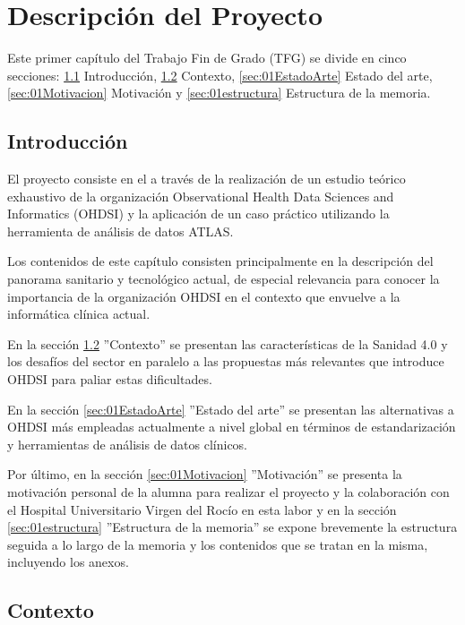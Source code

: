 \chapter{Descripción del Proyecto}\label{cap:01introduccion}

Este primer capítulo del Trabajo Fin de Grado (TFG) se divide en cinco secciones: \ref{sec:01intro} Introducción, \ref{sec:01Contexto} Contexto, \ref{sec:01EstadoArte} Estado del arte, \ref{sec:01Motivacion} Motivación y \ref{sec:01estructura} Estructura de la memoria.

\section{Introducción} \label{sec:01intro}

El proyecto consiste en el \textbf{\textit{\tfgTitle}} a través de la realización de un estudio teórico exhaustivo de la organización Observational Health Data Sciences and Informatics (OHDSI) y la aplicación de un caso práctico utilizando la herramienta de análisis de datos ATLAS.

Los contenidos de este capítulo consisten principalmente en la descripción del panorama sanitario y tecnológico actual, de especial relevancia para conocer la importancia de la organización OHDSI en el contexto que envuelve a la informática clínica actual.

En la sección \ref{sec:01Contexto} ''Contexto'' se presentan las características de la Sanidad 4.0 y los desafíos del sector en paralelo a las propuestas más relevantes que introduce OHDSI para paliar estas dificultades.

En la sección \ref{sec:01EstadoArte} ''Estado del arte'' se presentan las alternativas a OHDSI más empleadas actualmente a nivel global en términos de estandarización y herramientas de análisis de datos clínicos.

Por último, en la sección \ref{sec:01Motivacion} ''Motivación'' se presenta la motivación personal de la alumna para realizar el proyecto y la colaboración con el Hospital Universitario Virgen del Rocío en esta labor y en la sección \ref{sec:01estructura} ''Estructura de la memoria'' se expone brevemente la estructura seguida a lo largo de la memoria y los contenidos que se tratan en la misma, incluyendo los anexos.


\section{Contexto} \label{sec:01Contexto} 

